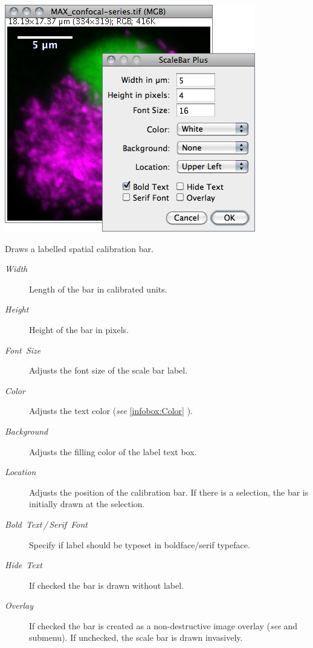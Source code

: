 \begin{minipage}[c][1\totalheight][t]{0.56\columnwidth}%
\includegraphics[scale=0.55]{images/ScaleBar}%
\end{minipage}%
\begin{minipage}[c][1\totalheight][t]{0.44\columnwidth}%
Draws a labelled spatial calibration bar.
\begin{description}
\item [{\emph{Width}}] Length of the bar in calibrated units.
\item [{\emph{Height}}] Height of the bar in pixels.
\item [{\emph{Font\ Size}}] Adjusts the font size of the scale bar label.
\item [{\emph{Color}}] Adjusts the text color (\emph{see} \ref{infobox:Color}
).
\item [{\emph{Background}}] Adjusts the filling color of the label text
box.\end{description}
%
\end{minipage}
\begin{description}
\item [{\emph{Location}}] Adjusts the position of the calibration bar.
If there is a selection, the bar is initially drawn at the selection.
\item [{\emph{Bold\ Text\,/\,Serif\ Font}}] Specify if label should
be typeset in boldface/serif typeface.
\item [{\emph{Hide}\ \emph{Text}}] If checked the bar is drawn without
label.
\item [{\emph{Overlay}}] If checked the bar is created as a non-destructive
image overlay (\emph{see}  and 
submenu). If unchecked, the scale bar is drawn invasively.
\end{description}

